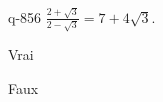 \begin{truefalse}{q-856}
$\frac{2+\sqrt 3}{2-\sqrt 3} = 7+4\sqrt 3$.
\item* Vrai
\item Faux
\end{truefalse}

